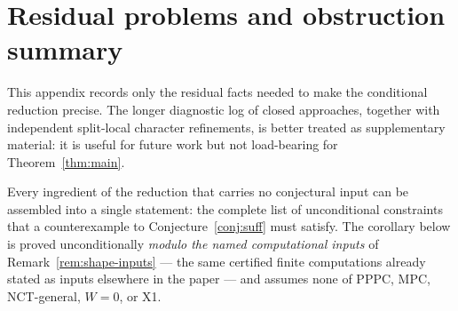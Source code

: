 \documentclass[11pt]{amsart}
\theoremstyle{plain}
\theoremstyle{definition}
\theoremstyle{remark}
\numberwithin{equation}{section}
\begin{document}
\appendix

\section{Residual problems and obstruction summary}\label{sec:residual-appendix}

This appendix records only the residual facts needed to make the conditional reduction precise. The longer diagnostic log of closed approaches, together with independent split-local character refinements, is better treated as supplementary material: it is useful for future work but not load-bearing for Theorem~\ref{thm:main}.

Every ingredient of the reduction that carries no conjectural input can be
assembled into a single statement: the complete list of unconditional
constraints that a counterexample to Conjecture~\ref{conj:suff} must
satisfy. The corollary below is proved unconditionally \emph{modulo the
named computational inputs} of Remark~\ref{rem:shape-inputs} --- the same
certified finite computations already stated as inputs elsewhere in the
paper --- and assumes none of PPPC, MPC, NCT-general, $W = 0$, or X1.
\end{document}
